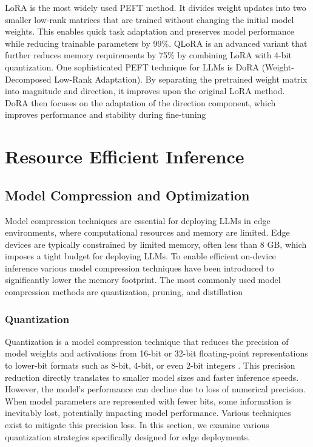 \documentclass[11pt]{IEEEtran}
\begin{document}
LoRA \cite{b12} is the most widely used PEFT method. It divides weight updates into two smaller low-rank matrices that are trained without changing the initial model weights. This enables quick task adaptation and preserves model performance while reducing trainable parameters by 99\%. QLoRA \cite{b13} is an advanced variant that further reduces memory requirements by 75\% by combining LoRA with 4-bit quantization. One sophisticated PEFT technique for LLMs is DoRA (Weight-Decomposed Low-Rank Adaptation)\cite{b14}. By separating the pretrained weight matrix into magnitude and direction, it improves upon the original LoRA method. DoRA then focuses on the adaptation of the direction component, which improves performance and stability during fine-tuning

\section{Resource Efficient Inference}
\subsection{Model Compression and Optimization}
Model compression techniques are essential for deploying LLMs in edge environments, where computational resources and memory are limited. Edge devices are typically constrained by limited memory, often less than 8 GB, which imposes a tight budget for deploying LLMs. To enable efficient on-device inference various model compression techniques have been introduced to significantly lower the memory footprint. The most commonly used model compression methods are quantization, pruning, and distillation

\subsubsection{Quantization}
Quantization is a model compression technique that reduces the precision of model weights and activations from 16-bit or 32-bit floating-point representations to lower-bit formats such as 8-bit, 4-bit, or even 2-bit integers \cite{b18}. This precision reduction directly translates to smaller model sizes and faster inference speeds. However, the model's performance can decline due to loss of numerical precision. When model parameters are represented with fewer bits, some information is inevitably lost, potentially impacting model performance. Various techniques exist to mitigate this precision loss. In this section, we examine various quantization strategies specifically designed for edge deployments.
\end{document}
